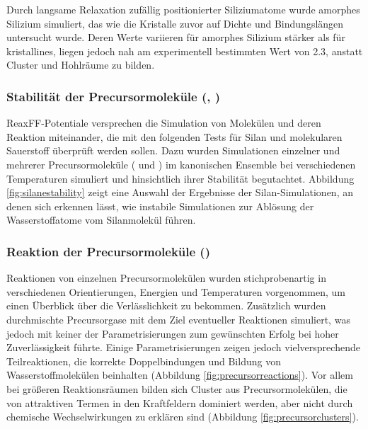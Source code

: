 Durch langsame Relaxation zufällig positionierter Siliziumatome wurde amorphes Silizium simuliert, das wie die Kristalle zuvor auf Dichte und Bindungslängen untersucht wurde.
Deren Werte variieren für amorphes Silizium stärker als für kristallines, liegen jedoch nah am experimentell bestimmten Wert von \SI{2.3}{\gpcc}\cite{remes_optical_1998}, anstatt Cluster und Hohlräume zu bilden.

\subsubsection{Stabilität der Precursormoleküle (, )}

ReaxFF-Potentiale versprechen die Simulation von Molekülen und deren Reaktion miteinander, die mit den folgenden Tests für Silan und molekularen Sauerstoff überprüft werden sollen.
Dazu wurden Simulationen einzelner und mehrerer Precursormoleküle ( und ) im kanonischen Ensemble bei verschiedenen Temperaturen simuliert und hinsichtlich ihrer Stabilität begutachtet.
Abbildung \ref{fig:silanestability} zeigt eine Auswahl der Ergebnisse der Silan-Simulationen, an denen sich erkennen lässt, wie instabile Simulationen zur Ablösung der Wasserstoffatome vom Silanmolekül führen.

\subsubsection{Reaktion der Precursormoleküle ()}

Reaktionen von einzelnen Precursormolekülen wurden stichprobenartig in verschiedenen Orientierungen, Energien und Temperaturen vorgenommen, um einen Überblick über die Verlässlichkeit zu bekommen.
Zusätzlich wurden durchmischte Precursorgase mit dem Ziel eventueller Reaktionen simuliert, was jedoch mit keiner der Parametrisierungen zum gewünschten Erfolg bei hoher Zuverlässigkeit führte.
Einige Parametrisierungen zeigen jedoch vielversprechende Teilreaktionen, die korrekte Doppelbindungen und Bildung von Wasserstoffmolekülen beinhalten (Abbildung \ref{fig:precursorreactions}).
Vor allem bei größeren Reaktionsräumen bilden sich Cluster aus Precursormolekülen, die von attraktiven Termen in den Kraftfeldern dominiert werden, aber nicht durch chemische Wechselwirkungen zu erklären sind (Abbildung \ref{fig:precursorclusters}).

